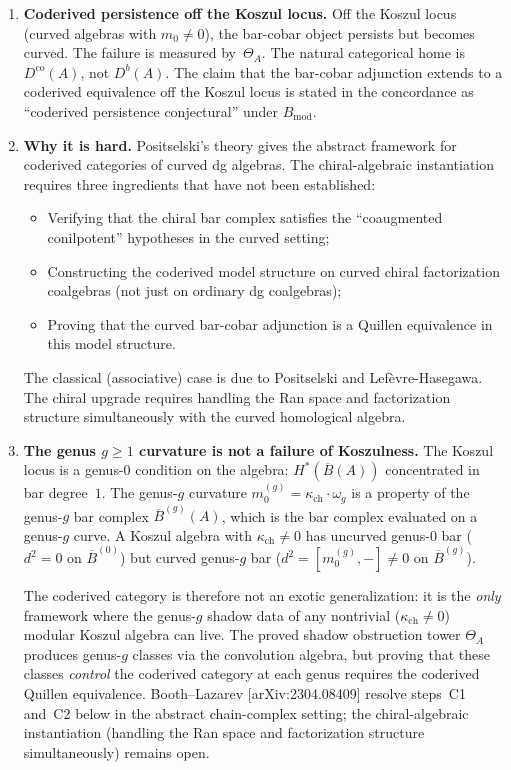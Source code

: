 \documentclass[11pt]{article}
\newcommand{\barB}{\overline{B}}
\begin{document}
\begin{enumerate}[label=(\arabic*)]
\item \textbf{Coderived persistence off the Koszul locus.}
 Off the Koszul locus (curved algebras with $m_0 \neq 0$), the bar-cobar object
 persists but becomes curved. The failure is measured by~$\Theta_A$.
 The natural categorical home is $D^{\mathrm{co}}(A)$, not $D^b(A)$.
 The claim that the bar-cobar adjunction extends to a coderived equivalence
 off the Koszul locus is stated in the concordance as ``coderived persistence
 conjectural'' under $B_{\mathrm{mod}}$.

\item \textbf{Why it is hard.}
 Positselski's theory gives the abstract framework for coderived categories
 of curved dg algebras. The chiral-algebraic instantiation requires three
 ingredients that have not been established:
 \begin{itemize}
 \item Verifying that the chiral bar complex satisfies the ``coaugmented
 conilpotent'' hypotheses in the curved setting;
 \item Constructing the coderived model structure on curved chiral
 factorization coalgebras (not just on ordinary dg coalgebras);
 \item Proving that the curved bar-cobar adjunction is a Quillen equivalence
 in this model structure.
 \end{itemize}
 The classical (associative) case is due to Positselski and Lef\`evre-Hasegawa.
 The chiral upgrade requires handling the Ran space and factorization
 structure simultaneously with the curved homological algebra.

\item \textbf{The genus $g \geq 1$ curvature is not a failure of Koszulness.}
 The Koszul locus is a genus-$0$ condition on the algebra: $H^*(\barB(A))$
 concentrated in bar degree~$1$. The genus-$g$ curvature $m_0^{(g)} = \kappa_{\mathrm{ch}} \cdot \omega_g$
 is a property of the genus-$g$ bar complex $\barB^{(g)}(A)$, which is the bar
 complex evaluated on a genus-$g$ curve. A Koszul algebra with $\kappa_{\mathrm{ch}} \neq 0$
 has uncurved genus-$0$ bar ($d^2 = 0$ on $\barB^{(0)}$) but curved genus-$g$ bar
 ($d^2 = [m_0^{(g)}, -] \neq 0$ on $\barB^{(g)}$).

 The coderived category is therefore not an exotic generalization: it is the
 \emph{only} framework where the genus-$g$ shadow data of any nontrivial
 ($\kappa_{\mathrm{ch}} \neq 0$) modular Koszul algebra can live. The proved shadow
 obstruction tower $\Theta_A$ produces genus-$g$ classes via the convolution
 algebra, but proving that these classes \emph{control} the coderived category
 at each genus requires the coderived Quillen equivalence.
 Booth--Lazarev [arXiv:2304.08409] resolve steps~C1 and~C2 below in the
 abstract chain-complex setting; the chiral-algebraic instantiation
 (handling the Ran space and factorization structure simultaneously)
 remains open.


\end{enumerate}
\end{document}
